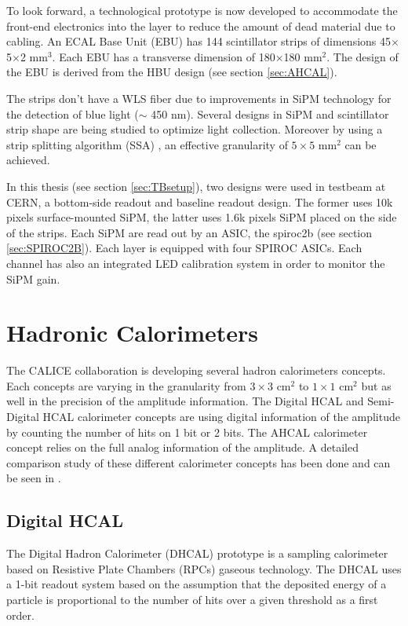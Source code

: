To look forward, a technological prototype is now developed to accommodate the front-end electronics into the layer to reduce the amount of dead material due to cabling. An ECAL Base Unit (EBU) has 144 scintillator strips of dimensions 45$\times$5$\times$2 mm$^3$. Each EBU has a transverse dimension of 180$\times$180 mm$^2$. The design of the EBU is derived from the HBU design (see section \ref{sec:AHCAL}).

The strips don't have a WLS fiber due to improvements in SiPM technology for the detection of blue light ($\sim$ 450 nm). Several designs in SiPM and scintillator strip shape are being studied to optimize light collection. Moreover by using a strip splitting algorithm (SSA) \cite{Kotera:2014psa}, an effective granularity of $5\times5$ mm$^2$ can be achieved.

In this thesis (see section \ref{sec:TBsetup}), two designs were used in testbeam at CERN, a bottom-side readout and baseline readout design. The former uses 10k pixels surface-mounted SiPM, the latter uses 1.6k pixels SiPM placed on the side of the strips. Each SiPM are read out by an ASIC, the \acrshort{spiroc2b} (see section \ref{sec:SPIROC2B}). Each layer is equipped with four SPIROC ASICs. Each channel has also an integrated LED calibration system in order to monitor the SiPM gain.

\section{Hadronic Calorimeters}
\label{sec:HadCal}

The CALICE collaboration is developing several hadron calorimeters concepts. Each concepts are varying in the granularity from $3\times3$ cm$^2$ to $1\times1$ cm$^2$ but as well in the precision of the amplitude information. The Digital HCAL and Semi-Digital HCAL calorimeter concepts are using digital information of the amplitude by counting the number of hits on 1 bit or 2 bits. The AHCAL calorimeter concept relies on the full analog information of the amplitude. A detailed comparison study of these different calorimeter concepts has been done and can be seen in \cite{Neubueser2016}.

\subsection{Digital HCAL}

The Digital Hadron Calorimeter (DHCAL) prototype \cite{Bilki:2013bea} is a sampling calorimeter based on Resistive Plate Chambers (RPCs) \cite{BEDJIDIAN2010120} gaseous technology. The DHCAL uses a 1-bit readout system based on the assumption that the deposited energy of a particle is proportional to the number of hits over a given threshold as a first order.

